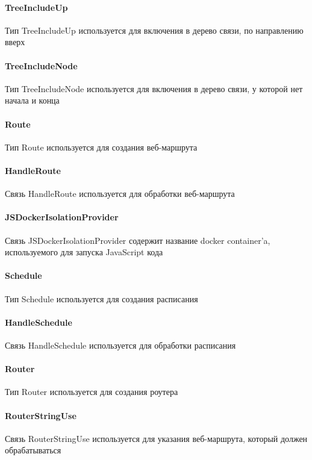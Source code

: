 \documentclass{article}
\begin{document}
\paragraph*{TreeIncludeUp}\hypertarget{Core.TreeIncludeUp.Description}{}
Тип TreeIncludeUp используется для включения в
дерево связи, по направлению вверх
\paragraph*{TreeIncludeNode}\hypertarget{Core.TreeIncludeNode.Description}{}
Тип TreeIncludeNode используется для
включения в дерево связи, у которой нет начала и конца
\paragraph*{Route}\hypertarget{Core.Route.Description}{}
Тип Route используется для создания веб-маршрута
\paragraph*{HandleRoute}\hypertarget{Core.HandleRoute.Description}{}
Связь HandleRoute используется для обработки
веб-маршрута
\paragraph*{JSDockerIsolationProvider}\hypertarget{Core.JSDockerIsolationProvider.Description}{}
Связь JSDockerIsolationProvider содержит название docker container'a,
используемого для запуска JavaScript кода
\paragraph*{Schedule}\hypertarget{Core.Schedule.Description}{}
Тип Schedule используется для создания расписания
\paragraph*{HandleSchedule}\hypertarget{Core.HandleSchedule.Description}{}
Связь HandleSchedule используется для обработки расписания
\paragraph*{Router}\hypertarget{Core.Router.Description}{}
Тип Router используется для создания роутера
\paragraph*{RouterStringUse}\hypertarget{Core.RouterStringUse.Description}{}
Связь RouterStringUse используется для
указания веб-маршрута, который должен обрабатываться
\end{document}
